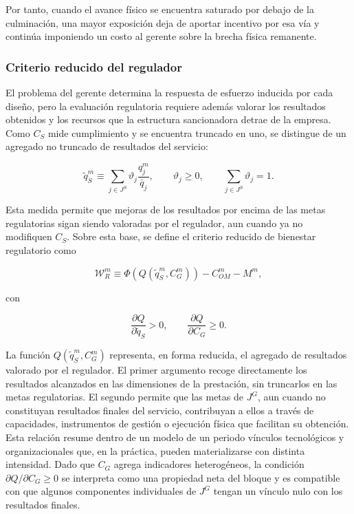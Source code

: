 Por tanto, cuando el avance físico se encuentra saturado por debajo de la culminación, una mayor exposición deja de aportar incentivo por esa vía y continúa imponiendo un costo al gerente sobre la brecha física remanente.

\subsubsection{Criterio reducido del regulador}

El problema del gerente determina la respuesta de esfuerzo inducida por cada diseño, pero la evaluación regulatoria requiere además valorar los resultados obtenidos y los recursos que la estructura sancionadora detrae de la empresa. Como \(C_S\) mide cumplimiento y se encuentra truncado en uno, se distingue de un agregado no truncado de resultados del servicio:

\begin{equation}
\label{eq:resultado_servicio_no_truncado}
\widetilde q_S^m
\equiv
\sum_{j\in J^S}
\vartheta_j
\frac{q_j^m}{\bar q_j},
\qquad
\vartheta_j\geq0,
\qquad
\sum_{j\in J^S}\vartheta_j=1.
\end{equation}

Esta medida permite que mejoras de los resultados por encima de las metas regulatorias sigan siendo valoradas por el regulador, aun cuando ya no modifiquen \(C_S\). Sobre esta base, se define el criterio reducido de bienestar regulatorio como

\begin{equation}
\label{eq:bienestar_regulador}
\mathcal W_R^m
\equiv
\Phi\!\left(
Q(\widetilde q_S^m,C_G^m)
\right)
-
C_{OM}^m
-
M^m,
\end{equation}

con

\begin{equation}
\label{eq:propiedades_resultado_regulador}
\frac{\partial Q}{\partial \widetilde q_S}
>
0,
\qquad
\frac{\partial Q}{\partial C_G}
\geq
0.
\end{equation}

La función \(Q(\widetilde q_S^m,C_G^m)\) representa, en forma reducida, el agregado de resultados valorado por el regulador. El primer argumento recoge directamente los resultados alcanzados en las dimensiones de la prestación, sin truncarlos en las metas regulatorias. El segundo permite que las metas de \(J^G\), aun cuando no constituyan resultados finales del servicio, contribuyan a ellos a través de capacidades, instrumentos de gestión o ejecución física que facilitan su obtención. Esta relación resume dentro de un modelo de un periodo vínculos tecnológicos y organizacionales que, en la práctica, pueden materializarse con distinta intensidad. Dado que \(C_G\) agrega indicadores heterogéneos, la condición \(\partial Q/\partial C_G\geq0\) se interpreta como una propiedad neta del bloque y es compatible con que algunos componentes individuales de \(J^G\) tengan un vínculo nulo con los resultados finales.

